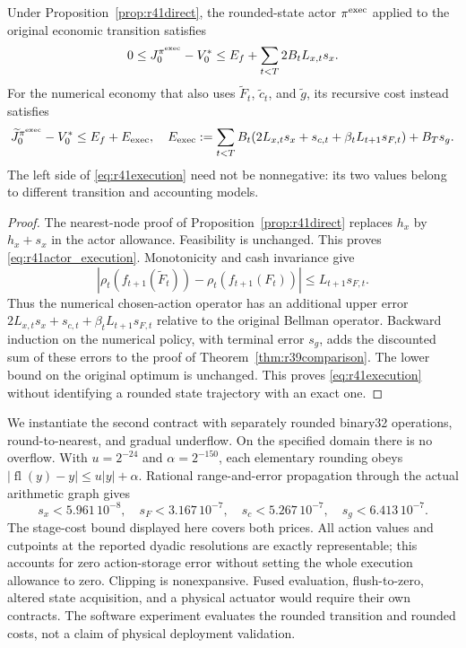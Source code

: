 \begin{proposition}
\label{prop:r41deployment}
Under Proposition~\ref{prop:r41direct}, the rounded-state actor
$\pi^{\rm exec}$ applied to the original economic transition satisfies
\begin{equation}
 0\leq J_0^{\pi^{\rm exec}}-V_0^*
       \leq E_f+\sum_{t<T}2B_tL_{x,t}s_x.
 \label{eq:r41actor_execution}
\end{equation}
For the numerical economy that also uses $\widetilde F_t$,
$\widetilde c_t$, and $\widetilde g$, its recursive cost instead satisfies
\begin{equation}
 \widetilde J_0^{\pi^{\rm exec}}-V_0^*
 \leq E_f+E_{\rm exec},\quad
 E_{\rm exec}:=\sum_{t<T}B_t
 (2L_{x,t}s_x+s_{c,t}+\beta_tL_{t+1}s_{F,t})+B_Ts_g.
 \label{eq:r41execution}
\end{equation}
The left side of \eqref{eq:r41execution} need not be nonnegative: its two
values belong to different transition and accounting models.
\end{proposition}
\begin{proof}
The nearest-node proof of Proposition~\ref{prop:r41direct} replaces $h_x$
by $h_x+s_x$ in the actor allowance. Feasibility is unchanged. This proves
\eqref{eq:r41actor_execution}. Monotonicity and cash invariance give
\[
 |\rho_t(f_{t+1}(\widetilde F_t))-
   \rho_t(f_{t+1}(F_t))|\leq L_{t+1}s_{F,t}.
\]
Thus the numerical chosen-action operator has an additional upper error
$2L_{x,t}s_x+s_{c,t}+\beta_tL_{t+1}s_{F,t}$ relative to the original Bellman
operator. Backward induction on the numerical policy, with terminal error
$s_g$, adds the discounted sum of these errors to the proof of
Theorem~\ref{thm:r39comparison}. The lower bound on the original optimum is
unchanged. This proves \eqref{eq:r41execution} without identifying a rounded
state trajectory with an exact one.
\end{proof}

We instantiate the second contract with separately rounded binary32
operations, round-to-nearest, and gradual underflow. On the specified domain
there is no overflow. With $u=2^{-24}$ and $\alpha=2^{-150}$, each elementary
rounding obeys $|\operatorname{fl}(y)-y|\leq u|y|+\alpha$. Rational
range-and-error propagation through the actual arithmetic graph gives
\[
 s_x<5.961\,10^{-8},\quad s_F<3.167\,10^{-7},\quad
 s_c<5.267\,10^{-7},\quad s_g<6.413\,10^{-7}.
\]
The stage-cost bound displayed here covers both prices. All action values
and cutpoints at the reported dyadic resolutions are exactly representable;
this accounts for zero action-storage error without setting the whole
execution allowance to zero. Clipping is nonexpansive. Fused evaluation,
flush-to-zero, altered state acquisition, and a physical actuator would
require their own contracts. The software experiment evaluates the rounded
transition and rounded costs, not a claim of physical deployment validation.
